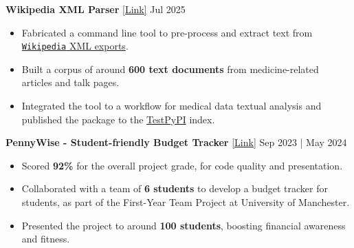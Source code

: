 \documentclass[a4paper]{extarticle}
\begin{document}
\noindent
\textbf{Wikipedia XML Parser}
\href{https://github.com/manojmanikandan7/WikipediaXmlParser}{[Link]}
\hfill Jul 2025 %
\begin{itemize}
  \item Fabricated a command line tool to pre-process and extract
    text from
    \href{https://en.wikipedia.org/wiki/Special:Export}{\texttt{Wikipedia}
    XML exports}.
  \item Built a corpus of around \textbf{600 text documents} from
    medicine-related articles and talk pages.
  \item Integrated the tool to a workflow for medical data textual
    analysis and published the package to the
    \href{https://test.pypi.org/project/wikipedia-xml-parser/}{TestPyPI} index.
\end{itemize}

\noindent
\textbf{PennyWise - Student-friendly Budget Tracker}
\href{https://github.com/manojmanikandan7/PennyWise}{[Link]} \hfill
Sep 2023 | May 2024 %
\begin{itemize}
  \item Scored \textbf{92\%} for the overall project grade, for code
    quality and presentation.
  \item Collaborated with a team of \textbf{6 students} to develop a
    budget tracker for students, as part of the First-Year Team
    Project at University of Manchester.
  \item Presented the project to around \textbf{100 students},
    boosting financial awareness and fitness.
\end{itemize}

\end{document}
